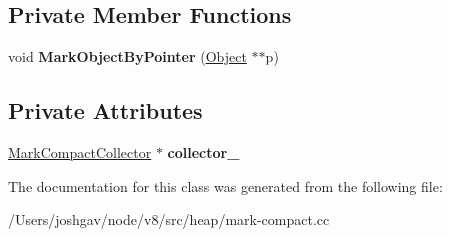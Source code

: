\subsection*{Private Member Functions}
\begin{DoxyCompactItemize}
\item 
void {\bfseries Mark\+Object\+By\+Pointer} (\hyperlink{classv8_1_1internal_1_1_object}{Object} $\ast$$\ast$p)\hypertarget{classv8_1_1internal_1_1_root_marking_visitor_aaad02f866372547219e304aa80b7ee01}{}\label{classv8_1_1internal_1_1_root_marking_visitor_aaad02f866372547219e304aa80b7ee01}

\end{DoxyCompactItemize}
\subsection*{Private Attributes}
\begin{DoxyCompactItemize}
\item 
\hyperlink{classv8_1_1internal_1_1_mark_compact_collector}{Mark\+Compact\+Collector} $\ast$ {\bfseries collector\+\_\+}\hypertarget{classv8_1_1internal_1_1_root_marking_visitor_adc1675ec6c9fb1eb21c8d2ba9ec18755}{}\label{classv8_1_1internal_1_1_root_marking_visitor_adc1675ec6c9fb1eb21c8d2ba9ec18755}

\end{DoxyCompactItemize}


The documentation for this class was generated from the following file\+:\begin{DoxyCompactItemize}
\item 
/\+Users/joshgav/node/v8/src/heap/mark-\/compact.\+cc\end{DoxyCompactItemize}

